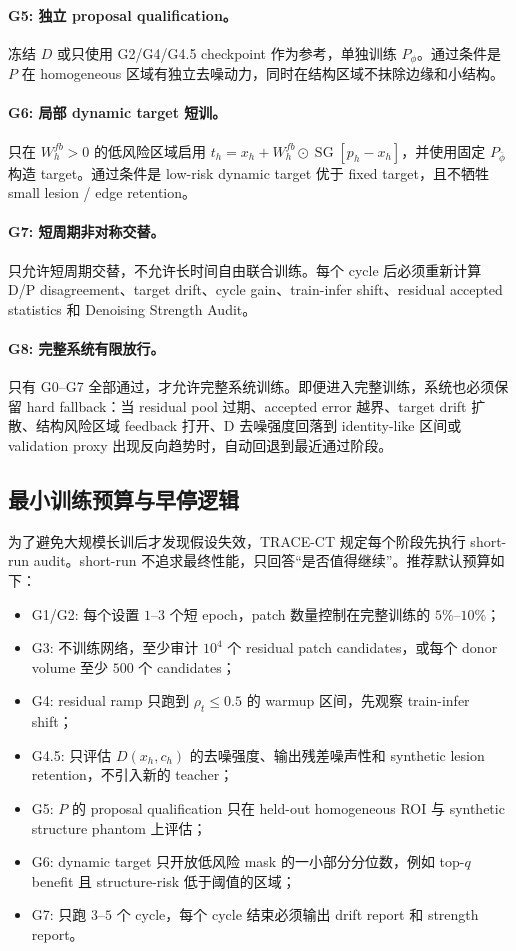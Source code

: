 \documentclass[11pt,a4paper,UTF8,fontset=fandol]{ctexart}
\theoremstyle{definition}
\DeclareMathOperator{\SG}{SG}
\begin{document}
\paragraph{G5: 独立 proposal qualification。}
冻结 $D$ 或只使用 G2/G4/G4.5 checkpoint 作为参考，单独训练 $P_\phi$。通过条件是 $P$ 在 homogeneous 区域有独立去噪动力，同时在结构区域不抹除边缘和小结构。

\paragraph{G6: 局部 dynamic target 短训。}
只在 $W_h^{fb}>0$ 的低风险区域启用 $t_h=x_h+W_h^{fb}\odot \SG[p_h-x_h]$，并使用固定 $P_{\bar\phi}$ 构造 target。通过条件是 low-risk dynamic target 优于 fixed target，且不牺牲 small lesion / edge retention。

\paragraph{G7: 短周期非对称交替。}
只允许短周期交替，不允许长时间自由联合训练。每个 cycle 后必须重新计算 D/P disagreement、target drift、cycle gain、train-infer shift、residual accepted statistics 和 Denoising Strength Audit。

\paragraph{G8: 完整系统有限放行。}
只有 G0--G7 全部通过，才允许完整系统训练。即便进入完整训练，系统也必须保留 hard fallback：当 residual pool 过期、accepted error 越界、target drift 扩散、结构风险区域 feedback 打开、D 去噪强度回落到 identity-like 区间或 validation proxy 出现反向趋势时，自动回退到最近通过阶段。

\subsection{最小训练预算与早停逻辑}

为了避免大规模长训后才发现假设失效，TRACE-CT 规定每个阶段先执行 short-run audit。short-run 不追求最终性能，只回答“是否值得继续”。推荐默认预算如下：
\begin{itemize}
    \item G1/G2: 每个设置 $1$--$3$ 个短 epoch，patch 数量控制在完整训练的 $5\%$--$10\%$；
    \item G3: 不训练网络，至少审计 $10^4$ 个 residual patch candidates，或每个 donor volume 至少 $500$ 个 candidates；
    \item G4: residual ramp 只跑到 $\rho_t\le 0.5$ 的 warmup 区间，先观察 train-infer shift；
    \item G4.5: 只评估 $D(x_h,c_h)$ 的去噪强度、输出残差噪声性和 synthetic lesion retention，不引入新的 teacher；
    \item G5: $P$ 的 proposal qualification 只在 held-out homogeneous ROI 与 synthetic structure phantom 上评估；
    \item G6: dynamic target 只开放低风险 mask 的一小部分分位数，例如 top-$q$ benefit 且 structure-risk 低于阈值的区域；
    \item G7: 只跑 $3$--$5$ 个 cycle，每个 cycle 结束必须输出 drift report 和 strength report。
\end{itemize}
\end{document}
